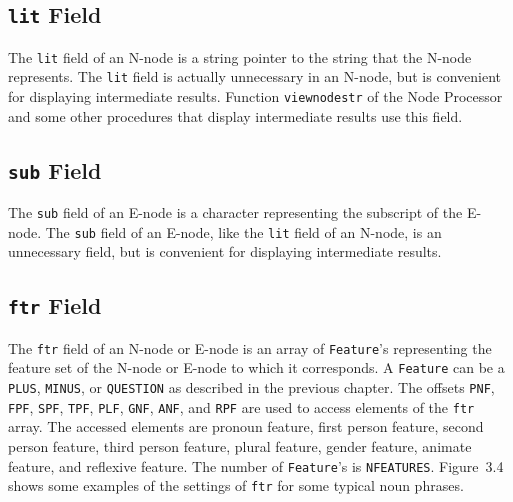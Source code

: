 \documentclass{article}
\begin{document}

\subsection{\textbf{\texttt{lit}} Field}

The \texttt{lit} field of an N-node is a string pointer to the
string that the N-node represents. The \texttt{lit} field is
actually unnecessary in an N-node, but is convenient for
displaying intermediate results. Function \texttt{viewnodestr} of
the Node Processor and some other procedures that display
intermediate results use this field.


\subsection{\textbf{\texttt{sub}} Field}

The \texttt{sub} field of an E-node is a character representing
the subscript of the E-node. The \texttt{sub} field of an
E-node, like the \texttt{lit} field of an N-node, is an
unnecessary field, but is convenient for displaying intermediate
results.


\subsection{\textbf{\texttt{ftr}} Field}

The \texttt{ftr} field of an N-node or E-node is an array of
\texttt{Feature}'s representing the feature set of the N-node or
E-node to which it corresponds. A \texttt{Feature} can be a
\texttt{PLUS}, \texttt{MINUS}, or \texttt{QUESTION} as described
in the previous chapter. The offsets \texttt{PNF}, \texttt{FPF},
\texttt{SPF}, \texttt{TPF}, \texttt{PLF}, \texttt{GNF},
\texttt{ANF}, and \texttt{RPF} are used to access elements of
the \texttt{ftr} array. The accessed elements are pronoun
feature, first person feature, second person feature, third
person feature, plural feature, gender feature, animate feature,
and reflexive feature. The number of \texttt{Feature}'s is
\texttt{NFEATURES}. Figure~3.4 shows some examples of the
settings of \texttt{ftr} for some typical noun phrases.
\end{document}
